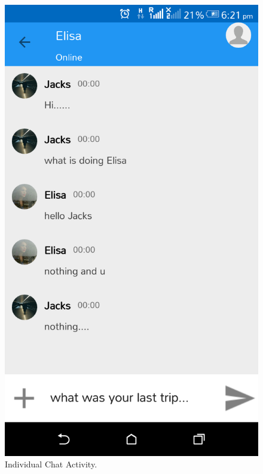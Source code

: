 \begin{appendices}
\begin{figure}[!ht]
	\centering
	\includegraphics[scale=0.2]{messages.png}
	\caption{\label{img24}  Individual Chat Activity.}
\end{figure}


\end{appendices}
